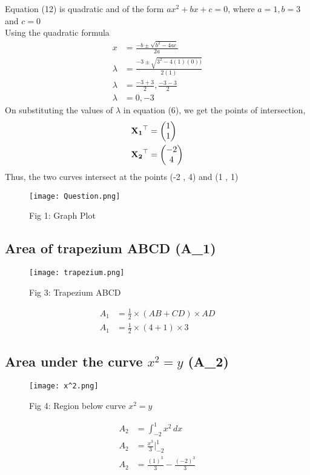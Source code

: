 Equation (12) is quadratic and of the form $ax^2 + bx + c = 0$, where $a = 1, b = 3$ and $c = 0$\\
Using the quadratic formula
\begin{align}
    x &= \frac{-b \pm \sqrt{b^2 - 4ac}}{2a}\\
    \lambda &= \frac{-3 \pm \sqrt{3^2 - 4(1)(0))}}{2(1)}\\
    \lambda &= \frac{-3 + 3}{2}, \frac{-3 - 3}{2}\\
    \lambda &= 0, -3
\end{align}
On substituting the values of $\lambda$ in equation (6), we get the points of intersection,
\begin{align}
    \mathbf{X_1}^{\top} &= \begin{pmatrix}1 \\ 1\end{pmatrix}\\
    \mathbf{X_2}^{\top} &= \begin{pmatrix}-2 \\ 4\end{pmatrix}
\end{align}
Thus, the two curves intersect at the points (-2 , 4) and (1 , 1)

\clearpage

\begin{figure}[t]
    \centering
    \texttt{[image: Question.png]}
    \caption*{Fig 1: Graph Plot}
    \label{fig:graph}
\end{figure}

\subsection{\textbf{Area of trapezium ABCD (A_1)}}
\begin{figure}[h]
    \centering
    \texttt{[image: trapezium.png]}
    \caption*{Fig 3: Trapezium ABCD}
    \label{fig:trap}
\end{figure}
\begin{align}
    A_1 &= \frac{1}{2}\times(AB + CD)\times AD\\
    A_1 &= \frac{1}{2}\times(4 + 1)\times 3
\end{align}
\begin{center}
\end{center}
\subsection{\textbf{Area under the curve $x^2 = y$ (A_2)}}
\begin{figure}[H]
    \centering
    \texttt{[image: x^2.png]}
    \caption*{Fig 4: Region below curve $x^2 = y$}
    \label{fig:x^2}
\end{figure}
\begin{align}
    A_2 &= \int_{-2}^{1} x^2 \, dx\\
    A_2 &= \frac{x^3}{3}\Biggr|_{-2}^{1}\\
    A_2 &= \frac{(1)^3}{3} - \frac{(-2)^3}{3}
\end{align}
\begin{center}
\end{center}    
